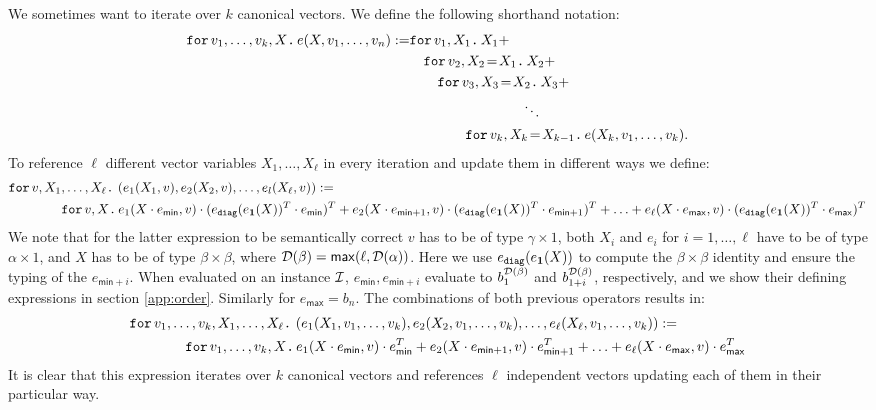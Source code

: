 We sometimes want to iterate over $k$ canonical vectors. We define the following shorthand notation:
\begin{align*}
  \ffor{v_1,\ldots, v_k}{X}{e(X,v_1,\ldots, v_n)}:= &\ffor{v_1}{X_1}{X_1 +} \\
  &\hspace{1em}\initf{X_1}{v_2}{X_2}{X_2 + } \\
  &\hspace{2em}\initf{X_2}{v_3}{X_3}{X_3 + } \\
  &\hspace{8em}\ddots \\
  &\hspace{4em}\initf{X_{k-1}}{v_k}{X_k}{ e(X_k,v_1,\ldots, v_k)}.
\end{align*}
To reference $\ell$ different vector variables $X_1,\ldots,X_\ell$ in every iteration and update them in different ways we define:
\begin{align*}
&\ffor{v}{X_1,\ldots, X_\ell}{\left( e_1(X_1,v), e_2(X_2,v), \ldots, e_l(X_\ell,v) \right)} :=\\
&\hspace{4em}\ffor{v}{X}{e_1(X\cdot e_{\mathsf{min}},v)\cdot (e_{\diag}(e_{\ones}(X))^T\cdot e_{\mathsf{min}})^T + e_2(X\cdot e_{\mathsf{min} + 1},v)\cdot (e_{\diag}(e_{\ones}(X))^T\cdot e_{\mathsf{min} + 1})^T + \ldots + e_\ell(X\cdot e_{\mathsf{max}},v)\cdot (e_{\diag}(e_{\ones}(X))^T\cdot e_{\mathsf{max}})^T}
\end{align*}
We note that for the latter expression to be semantically correct $v$ has to be of type $\gamma\times 1$, 
both $X_i$ and $e_i$ for $ i=1,\ldots,\ell$ have to be of type $\alpha\times 1$, 
and $X$ has to be of type $\beta\times\beta$, where $\dom(\beta)=\mathsf{max}(\ell,\dom(\alpha))$. Here
we use $e_{\diag}(e_{\ones}(X))$ to compute the $\beta\times\beta$ identity and ensure the typing of the
$e_{\mathsf{min} + i}$.
When evaluated on an instance $\I$,
$e_{\mathsf{min}}, e_{\mathsf{min} + i}$ evaluate to $b_1^{\dom(\beta)}$ and $b_{1+i}^{\dom(\beta)}$, respectively, and we show their defining expressions in section \ref{app:order}. Similarly for $e_{\mathsf{max}}=b_n$.
The combinations of both previous operators results in:
\begin{align*}
&\ffor{v_1,\ldots, v_k}{X_1,\ldots, X_\ell}{\left( e_1(X_1,v_1,\ldots, v_k), e_2(X_2,v_1,\ldots, v_k), \ldots, e_\ell(X_\ell,v_1,\ldots, v_k) \right)} :=\\
&\hspace{4em}\ffor{v_1,\ldots, v_k}{X}{e_1(X\cdot e_{\mathsf{min}},v)\cdot e_{\mathsf{min}}^T + e_2(X\cdot e_{\mathsf{min} + 1},v)\cdot e_{\mathsf{min} + 1}^T + \ldots + e_\ell(X\cdot e_{\mathsf{max}},v)\cdot e_{\mathsf{max}}^T}
\end{align*}
It is clear that this expression iterates over $k$ canonical vectors and references $\ell$ independent vectors updating each of them in their particular way.
